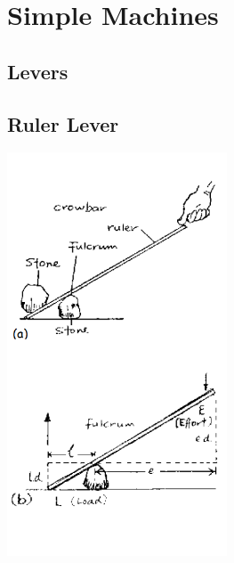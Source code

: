\section{Simple Machines} 


\begin{multicols}{2}


\section*{Levers} 


\subsection{Ruler Lever}

\begin{center}
\includegraphics[width=0.49\textwidth]{./img/source/ruler-lever.png}
\end{center}


\end{multicols}
